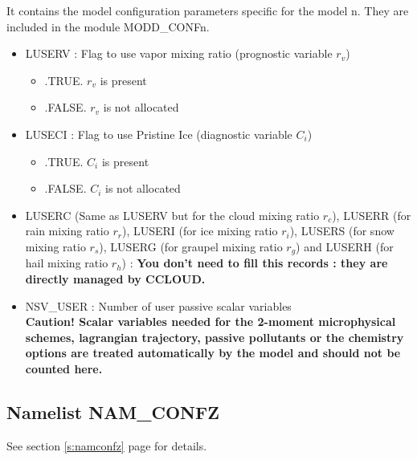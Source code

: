 It contains the model configuration parameters specific for the  model n. They
are included in the module MODD\_CONFn. 
\begin{itemize}
\item
{}
LUSERV : Flag to use vapor mixing ratio (prognostic variable $r_v$)
\begin{itemize}
\item   .TRUE. $r_v$ is present
\item   .FALSE. $r_v$ is not allocated
\end{itemize}
\item
LUSECI : Flag to use Pristine Ice (diagnostic variable $C_i$)
\begin{itemize}
\item   .TRUE. $C_i$ is present
\item   .FALSE. $C_i$ is not allocated
\end{itemize}
\item LUSERC (Same as LUSERV but for the cloud mixing ratio $r_c$), LUSERR (for rain mixing ratio $r_r$), LUSERI (for ice mixing ratio $r_i$), LUSERS (for snow mixing ratio $r_s$), LUSERG (for graupel mixing ratio $r_g$) and LUSERH (for hail mixing ratio $r_h$) : {\bf You don't need to fill this records : they are directly managed by CCLOUD.}
\item
NSV\_USER  : Number of user passive scalar variables \\
{\bf Caution! Scalar variables needed for the 2-moment microphysical schemes,
lagrangian trajectory, passive pollutants or the chemistry options are treated automatically by the model and
should not be counted here. }
\end{itemize}

\subsection{Namelist NAM\_CONFZ}
See section \ref{s:namconfz} page \pageref{s:namconfz} for details.

